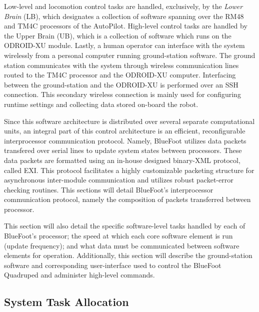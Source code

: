 	Low-level and locomotion control tasks are handled, exclusively, by the \emph{Lower Brain} (LB), which designates a collection of software spanning over the RM48 and TM4C processors of the AutoPilot. High-level control tasks are handled by the Upper Brain (UB), which is a collection of software which runs on the ODROID-XU module. Lastly, a human operator can interface with the system wirelessly from a personal computer running ground-station software. The ground station  communicates with the system through wireless communication lines routed to the TM4C processor and the ODROID-XU computer. Interfacing between the ground-station and the ODROID-XU is performed over an SSH connection. This secondary wireless connection is mainly used for configuring runtime settings and collecting data stored on-board the robot.

	Since this software architecture is distributed over several separate computational units, an integral part of this control architecture is an efficient, reconfigurable interprocessor communication protocol. Namely, BlueFoot utilizes data packets transfered over serial lines to update system states between processors. These data packets are formatted using an in-house designed binary-XML protocol, called EXI. This protocol facilitates a highly customizable packeting structure for asynchronous inter-module communication and utilizes robust packet-error checking routines. This sections will detail BlueFoot's interprocessor communication protocol, namely the composition of packets transferred between processor. 

	This section will also detail the specific software-level tasks handled by each of BlueFoot's processor; the speed at which each core software element is run (update frequency); and what data must be communicated between software elements for operation. Additionally, this section will describe the ground-station software and corresponding user-interface used to control the BlueFoot Quadruped and administer high-level commands.
	
	\subsection{System Task Allocation}

